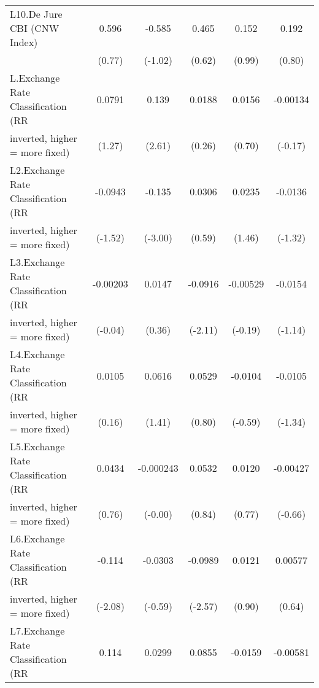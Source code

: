 \begin{table}[htbp]
\begin{tabular}{l*{5}{c}}
L10.De Jure CBI (CNW Index)             &    0.596         &   -0.585         &    0.465         &    0.152         &    0.192         \\
                                        &   (0.77)         &  (-1.02)         &   (0.62)         &   (0.99)         &   (0.80)         \\
\addlinespace
L.Exchange Rate Classification (RR      &   0.0791         &    0.139\sym{*}  &   0.0188         &   0.0156         & -0.00134         \\
inverted, higher = more fixed)          &   (1.27)         &   (2.61)         &   (0.26)         &   (0.70)         &  (-0.17)         \\
\addlinespace
L2.Exchange Rate Classification (RR     &  -0.0943         &   -0.135\sym{**} &   0.0306         &   0.0235         &  -0.0136         \\
inverted, higher = more fixed)          &  (-1.52)         &  (-3.00)         &   (0.59)         &   (1.46)         &  (-1.32)         \\
\addlinespace
L3.Exchange Rate Classification (RR     & -0.00203         &   0.0147         &  -0.0916\sym{*}  & -0.00529         &  -0.0154         \\
inverted, higher = more fixed)          &  (-0.04)         &   (0.36)         &  (-2.11)         &  (-0.19)         &  (-1.14)         \\
\addlinespace
L4.Exchange Rate Classification (RR     &   0.0105         &   0.0616         &   0.0529         &  -0.0104         &  -0.0105         \\
inverted, higher = more fixed)          &   (0.16)         &   (1.41)         &   (0.80)         &  (-0.59)         &  (-1.34)         \\
\addlinespace
L5.Exchange Rate Classification (RR     &   0.0434         &-0.000243         &   0.0532         &   0.0120         & -0.00427         \\
inverted, higher = more fixed)          &   (0.76)         &  (-0.00)         &   (0.84)         &   (0.77)         &  (-0.66)         \\
\addlinespace
L6.Exchange Rate Classification (RR     &   -0.114\sym{*}  &  -0.0303         &  -0.0989\sym{*}  &   0.0121         &  0.00577         \\
inverted, higher = more fixed)          &  (-2.08)         &  (-0.59)         &  (-2.57)         &   (0.90)         &   (0.64)         \\
\addlinespace
L7.Exchange Rate Classification (RR     &    0.114\sym{*}  &   0.0299         &   0.0855         &  -0.0159         & -0.00581         \\

\end{tabular}
\end{table}
